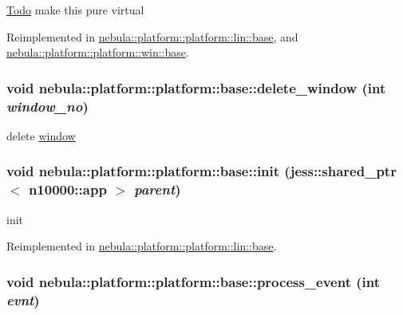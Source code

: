 \begin{Desc}
\item[\hyperlink{todo__todo000005}{Todo}]make this pure virtual \end{Desc}


Reimplemented in \hyperlink{classnebula_1_1platform_1_1platform_1_1lin_1_1base_a2edb327fb68f9198ec048d9902dddb3b}{nebula::platform::platform::lin::base}, and \hyperlink{classnebula_1_1platform_1_1platform_1_1win_1_1base_a6789ffe77928a45dc3cbd6dea0fd2d4b}{nebula::platform::platform::win::base}.\hypertarget{classnebula_1_1platform_1_1platform_1_1base_a587ca0776ffbbd94269afdc577c6085e}{
\subsubsection[{delete\_\-window}]{\setlength{\rightskip}{0pt plus 5cm}void nebula::platform::platform::base::delete\_\-window (int {\em window\_\-no})}}
\label{classnebula_1_1platform_1_1platform_1_1base_a587ca0776ffbbd94269afdc577c6085e}


delete \hyperlink{namespacenebula_1_1platform_1_1window}{window} \hypertarget{classnebula_1_1platform_1_1platform_1_1base_a1098d6ac08afd649c5ce01fbaafd3374}{
\subsubsection[{init}]{\setlength{\rightskip}{0pt plus 5cm}void nebula::platform::platform::base::init (jess::shared\_\-ptr$<$ {\bf n10000::app} $>$ {\em parent})}}
\label{classnebula_1_1platform_1_1platform_1_1base_a1098d6ac08afd649c5ce01fbaafd3374}


init 

Reimplemented in \hyperlink{classnebula_1_1platform_1_1platform_1_1lin_1_1base_af6aec1ac7ee95afb45b83d110cd0c1f0}{nebula::platform::platform::lin::base}.\hypertarget{classnebula_1_1platform_1_1platform_1_1base_a1fda0b0def9414c1bd3db49af6c9c825}{
\subsubsection[{process\_\-event}]{\setlength{\rightskip}{0pt plus 5cm}void nebula::platform::platform::base::process\_\-event (int {\em evnt})}}
\label{classnebula_1_1platform_1_1platform_1_1base_a1fda0b0def9414c1bd3db49af6c9c825}


